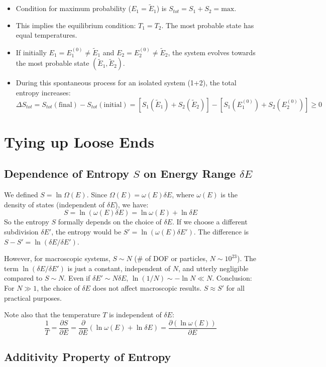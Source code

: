 \documentclass[11pt]{article}
\newcommand{\pderiv}[2]{\frac{\partial #1}{\partial #2}}
\newcommand{\OmegaE}{\Omega(E)}
\newcommand{\omegaE}{\omega(E)}
\newcommand{\deltaE}{\delta E}
\newcommand{\tE}{\tilde{E}} %
\begin{document}
\begin{itemize}
\begin{center}
    \end{center}
    \item Condition for maximum probability ($E_1=\tE_1$) is $S_{tot} = S_1 + S_2 = \text{max}$.
    \item This implies the equilibrium condition: $T_1 = T_2$. The most probable state has equal temperatures.
    \item If initially $E_1 = E_1^{(0)} \neq \tE_1$ and $E_2 = E_2^{(0)} \neq \tE_2$, the system evolves towards the most probable state $(\tE_1, \tE_2)$.
    \item During this spontaneous process for an isolated system (1+2), the total entropy increases:
    \[ \Delta S_{tot} = S_{tot}(\text{final}) - S_{tot}(\text{initial}) = [S_1(\tE_1) + S_2(\tE_2)] - [S_1(E_1^{(0)}) + S_2(E_2^{(0)})] \ge 0 \]
\end{itemize}

\section*{Tying up Loose Ends}

\subsection*{Dependence of Entropy $S$ on Energy Range $\deltaE$}

We defined $S = \ln \OmegaE$. Since $\OmegaE = \omegaE \deltaE$, where $\omegaE$ is the density of states (independent of $\deltaE$), we have:
\[ S = \ln(\omegaE \deltaE) = \ln \omegaE + \ln \deltaE \]
So the entropy $S$ formally depends on the choice of $\deltaE$.
If we choose a different subdivision $\deltaE'$, the entropy would be $S' = \ln(\omegaE \deltaE')$.
The difference is $S - S' = \ln(\deltaE / \deltaE')$.

However, for macroscopic systems, $S \sim N$ (\# of DOF or particles, $N \sim 10^{23}$).
The term $\ln(\deltaE / \deltaE')$ is just a constant, independent of $N$, and utterly negligible compared to $S \sim N$.
Even if $\deltaE' \sim N \deltaE$, $\ln(1/N) \sim -\ln N \ll N$.
Conclusion: For $N \gg 1$, the choice of $\deltaE$ does not affect macroscopic results. $S \approx S'$ for all practical purposes.

Note also that the temperature $T$ is independent of $\deltaE$:
\[ \frac{1}{T} = \pderiv{S}{E} = \pderiv{}{E} (\ln \omegaE + \ln \deltaE) = \pderiv{(\ln \omegaE)}{E} \]

\subsection*{Additivity Property of Entropy}
\end{document}
